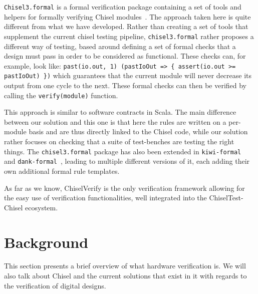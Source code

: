 \documentclass[conference]{IEEEtran}
\begin{document}
\texttt{Chisel3.formal}  is a formal verification package containing a set of tools and helpers for formally verifying Chisel modules~\cite{chisel:formal}. The approach taken here is quite different from what we have developed. Rather than creating a set of tools that supplement the current chisel testing pipeline, \texttt{chisel3.formal} rather proposes a different way of testing, based around defining a set of formal checks that a design must pass in order to be considered as functional. These checks can, for example, look like: \texttt{past(io.out, 1) (pastIoOut => \{ assert(io.out >= pastIoOut) \})} which guarantees that the current module will never decrease its output from one cycle to the next. These formal checks can then be verified by calling the \texttt{verify(module)} function. 

This approach is similar to software contracts in Scala. The main difference between our solution and this one is that here the rules are written on a per-module basis and are thus directly linked to the Chisel code, while our solution rather focuses on checking that a suite of test-benches are testing the right things. The \texttt{chisel3.formal} package has also been extended in \texttt{kiwi-formal}~\cite{chisel:kiwi-formal} and \texttt{dank-formal}~\cite{chisel:dank-formal}, leading to multiple different versions of it, each adding their own additional formal rule templates. 

As far as we know, ChiselVerify is the only verification framework allowing for the easy use of verification functionalities, well integrated into the ChiselTest-Chisel ecosystem.

\section{Background}
\label{sec:background}

This section presents a brief overview of what hardware verification is. We will also talk about Chisel and the current solutions that exist in it with regards to the verification of digital designs.
\end{document}

